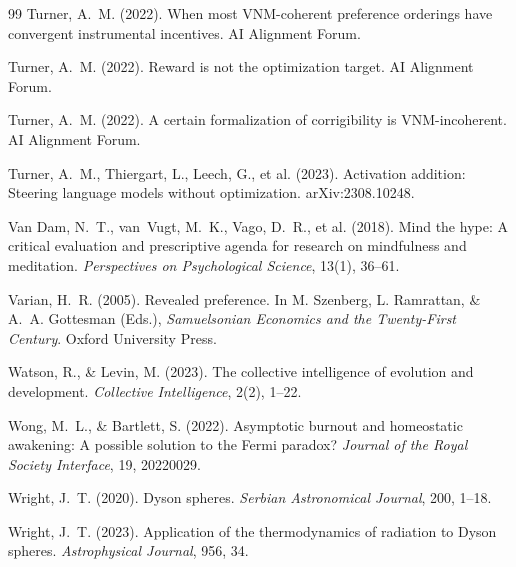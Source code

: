 \documentclass[11pt,a4paper,twocolumn]{article}
\begin{document}
\begin{thebibliography}{99}
 Turner, A.~M. (2022). When most VNM-coherent preference orderings have convergent instrumental incentives. AI Alignment Forum.

 Turner, A.~M. (2022). Reward is not the optimization target. AI Alignment Forum.

 Turner, A.~M. (2022). A certain formalization of corrigibility is VNM-incoherent. AI Alignment Forum.

 Turner, A.~M., Thiergart, L., Leech, G., et al. (2023). Activation addition: Steering language models without optimization. arXiv:2308.10248.

 Van Dam, N.~T., van~Vugt, M.~K., Vago, D.~R., et al. (2018). Mind the hype: A critical evaluation and prescriptive agenda for research on mindfulness and meditation. \textit{Perspectives on Psychological Science}, 13(1), 36--61.

 Varian, H.~R. (2005). Revealed preference. In M. Szenberg, L. Ramrattan, \& A.~A. Gottesman (Eds.), \textit{Samuelsonian Economics and the Twenty-First Century}. Oxford University Press.

 Watson, R., \& Levin, M. (2023). The collective intelligence of evolution and development. \textit{Collective Intelligence}, 2(2), 1--22.

 Wong, M.~L., \& Bartlett, S. (2022). Asymptotic burnout and homeostatic awakening: A possible solution to the Fermi paradox? \textit{Journal of the Royal Society Interface}, 19, 20220029.

 Wright, J.~T. (2020). Dyson spheres. \textit{Serbian Astronomical Journal}, 200, 1--18.

 Wright, J.~T. (2023). Application of the thermodynamics of radiation to Dyson spheres. \textit{Astrophysical Journal}, 956, 34.

\end{thebibliography}
\end{document}
